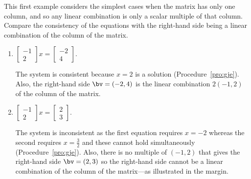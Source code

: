 \begin{example} \label{eg:}
This first example considers the simplest cases when the matrix has only one column, and so any linear combination is only a scalar multiple of that column.
Compare the consistency of the equations with the right-hand side being a linear combination of the column of the matrix.
\begin{enumerate}
\item \(\begin{bmatrix} -1\\2 \end{bmatrix}x
=\begin{bmatrix} -2\\4 \end{bmatrix}\).
\begin{solution} 
The system is consistent because \(x=2\) is a solution (Procedure~\ref{pro:gje}).
Also, the right-hand side \(\bv=(-2,4)\) is the linear combination \(2(-1,2)\) of the column of the matrix.
\end{solution}

\item \(\begin{bmatrix} -1\\2 \end{bmatrix}x
=\begin{bmatrix} 2\\3 \end{bmatrix}\).
\begin{solution} 
The system is inconsistent as the first equation requires \(x=-2\) whereas the second requires \(x=\tfrac32\) and these cannot hold simultaneously (Procedure~\ref{pro:gje}).
Also, there is no multiple of \((-1,2)\) that gives the right-hand side \(\bv=(2,3)\) so the right-hand side cannot be a linear combination of the column of the matrix---as illustrated in the margin.
\end{solution}


\end{enumerate}
\end{example}
